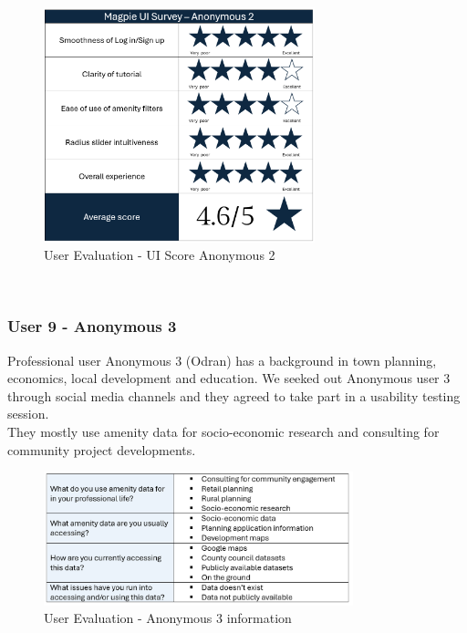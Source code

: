 \begin{figure}[h!]
    \centering
    \includegraphics[width=0.7\textwidth]{images/survey-sarah.png}
    \caption{User Evaluation - UI Score Anonymous 2}
\end{figure}\\


\newpage
\subsubsection{User 9 - Anonymous 3}
Professional user Anonymous 3 (Odran) has a background in town planning, economics, local development and education. We seeked out Anonymous user 3 through social media channels and they agreed to take part in a usability testing session.\\
They mostly use amenity data for socio-economic research and consulting for community project developments.\\
\begin{figure}[h!]
    \centering
    \includegraphics[width=0.8\textwidth]{images/odran-amenity-info.png}
    \caption{User Evaluation - Anonymous 3 information}
\end{figure}

